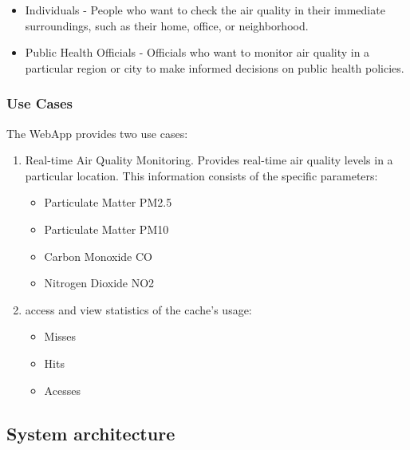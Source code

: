 \documentclass[12pt]{article}
\begin{document}
\begin{itemize}

\item Individuals - People who want to check the air quality in their immediate surroundings, such as their home, office, or neighborhood.

\item Public Health Officials - Officials who want to monitor air quality in a particular region or city to make informed decisions on public health policies.

\end{itemize}


\subsubsection{Use Cases}
The WebApp provides two use cases:

\begin{enumerate}

\item  Real-time Air Quality Monitoring. Provides real-time air quality levels in a particular location. This information consists of the specific parameters: 
	\begin{itemize}
		\item Particulate Matter PM2.5
		\item Particulate Matter PM10
		\item Carbon Monoxide CO
		\item Nitrogen Dioxide NO2
	\end{itemize}
	
\item access and view statistics of the cache's usage:
	\begin{itemize}
		\item Misses
		\item Hits
		\item Acesses
	\end{itemize}

\end{enumerate}


\subsection{System architecture}
\end{document}
